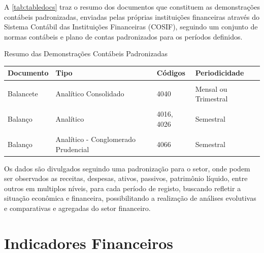\documentclass[
  12pt,
  12pt,
  openright,
  oneside,
  a4paper,
  chapter=TITLE,
  section=TITLE,
  subsection=TITLE,
  subsubsection=TITLE,
  english,
  portugues,
  sumario=tradicional]{abntex2}
\begin{document}
A \autoref{tab:tabledocs} traz o resumo dos documentos que constituem as demonstrações contábeis padronizadas, enviadas pelas próprias instituições financeiras através do Sistema Contábil das Instituições Financeiras (COSIF), seguindo um conjunto de normas contábeis e plano de contas padronizados para os períodos definidos.

\begin{qdr}
\vspace{20pt}
\caption{Resumo das Demonstrações Contábeis Padronizadas}
\vspace{1mm}
\begingroup\fontsize{10}{12}\selectfont

\begin{tabu} to 
\toprule
Documento & Tipo & Códigos & Periodicidade\\
\midrule
{} &  &  & \\
Balancete & Analítico Consolidado & 4040 & Mensal ou Trimestral\\
 &  &  & \\
Balanço & Analítico & 4016, 4026 & Semestral\\
 &  &  & \\
\addlinespace
Balanço & Analítico - Conglomerado Prudencial & 4066 & Semestral\\
\bottomrule
\end{tabu}
\endgroup{}
\vspace{1mm}
\label{tab:tabledocs}
\vspace{-2mm}
\end{qdr}

Os dados são divulgados seguindo uma padronização para o setor, onde podem ser observados as receitas, despesas, ativos, passivos, patrimônio líquido, entre outros em multiplos níveis, para cada período de registo, buscando refletir a situação econômica e financeira, possibilitando a realização de análises evolutivas e comparativas e agregadas do setor financeiro.

\section{Indicadores Financeiros}
\end{document}
